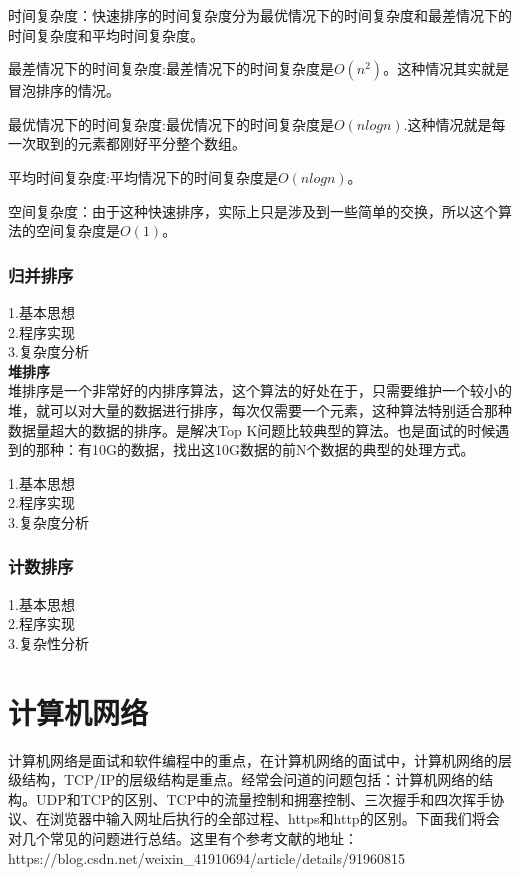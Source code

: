 \documentclass[UTF8]{ctexart}
\begin{document}
时间复杂度：快速排序的时间复杂度分为最优情况下的时间复杂度和最差情况下的时间复杂度和平均时间复杂度。

最差情况下的时间复杂度:最差情况下的时间复杂度是$O(n^2)$。这种情况其实就是冒泡排序的情况。

最优情况下的时间复杂度:最优情况下的时间复杂度是$O(nlogn)$.这种情况就是每一次取到的元素都刚好平分整个数组。

平均时间复杂度:平均情况下的时间复杂度是$O(nlogn)$。

空间复杂度：由于这种快速排序，实际上只是涉及到一些简单的交换，所以这个算法的空间复杂度是$O(1)$。

\subsubsection{归并排序}
1.基本思想\\
2.程序实现\\
3.复杂度分析\\
\textbf{堆排序}\\
堆排序是一个非常好的内排序算法，这个算法的好处在于，只需要维护一个较小的堆，就可以对大量的数据进行排序，每次仅需要一个元素，这种算法特别适合那种数据量超大的数据的排序。是解决Top K问题比较典型的算法。也是面试的时候遇到的那种：有10G的数据，找出这10G数据的前N个数据的典型的处理方式。

1.基本思想\\

2.程序实现\\ 

3.复杂度分析\\
\subsubsection{计数排序}
1.基本思想\\
2.程序实现\\
3.复杂性分析\\
\section{计算机网络}

计算机网络是面试和软件编程中的重点，在计算机网络的面试中，计算机网络的层级结构，TCP/IP的层级结构是重点。经常会问道的问题包括：计算机网络的结构。UDP和TCP的区别、TCP中的流量控制和拥塞控制、三次握手和四次挥手协议、在浏览器中输入网址后执行的全部过程、https和http的区别。下面我们将会对几个常见的问题进行总结。这里有个参考文献的地址：\\
https://blog.csdn.net/weixin\_41910694/article/details/91960815
\end{document}
